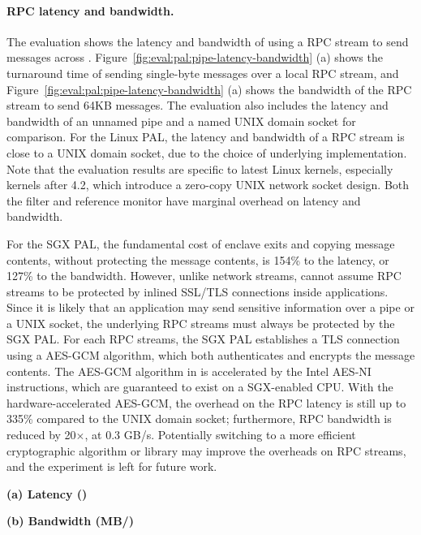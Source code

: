 \paragraph{RPC latency and bandwidth.}
The evaluation shows the latency and bandwidth of using a RPC stream to send messages across \picoprocs{}.
Figure~\ref{fig:eval:pal:pipe-latency-bandwidth} (a) shows
the turnaround time of sending single-byte messages over a local RPC stream, and Figure~\ref{fig:eval:pal:pipe-latency-bandwidth} (a) shows the bandwidth of the RPC stream to send
64KB messages.
The evaluation also includes the latency and bandwidth of an unnamed pipe and a named UNIX domain socket
for comparison.
For the Linux PAL, the latency and bandwidth of a RPC stream is
close to a UNIX domain socket, due to the choice of underlying implementation.
Note that the evaluation results are specific to latest Linux kernels, especially kernels after 4.2,
which introduce a zero-copy UNIX network socket design. 
Both the \seccomp{} filter and reference monitor have marginal overhead on latency and bandwidth.


For the SGX PAL,
the fundamental cost of enclave exits and copying message contents,
without protecting the message contents,
is \roughly{}154\% to the latency,
or \roughly{}127\% to the bandwidth.
However, unlike network streams, \graphenesgx{} cannot assume RPC streams to be protected by inlined SSL/TLS connections
inside applications.
Since it is likely that an application may send sensitive information
over a pipe or a UNIX socket,
the underlying RPC streams must always be protected by the SGX PAL.
For each RPC streams, the SGX PAL establishes a TLS connection using a AES-GCM algorithm, which both authenticates and encrypts the message contents.
The AES-GCM algorithm in \graphenesgx{} is accelerated by the Intel AES-NI instructions, which are guaranteed to exist on a SGX-enabled CPU.
With the hardware-accelerated AES-GCM,
the overhead on the RPC latency is still up to \roughly{}335\% compared to the UNIX domain socket;
furthermore, RPC bandwidth
is reduced by \roughly{}20$\times$, at \roughly{}0.3 GB/s.
Potentially switching to a more efficient cryptographic algorithm or library may improve the overheads on RPC streams,
and the experiment is left for future work.



\begin{figure*}[t!]
\centering
\footnotesize
{}
\parbox{0.30\textwidth}{\quad}
\parbox{0.34\textwidth}{\centering\bf (a) Latency ({\usec})}
\parbox{0.34\textwidth}{\centering\bf (b) Bandwidth (MB/\asec{})}
\caption{(a) Latency of sending a short message over RPC (lower is better), and (b) bandwidth of sending large data (higher is better).
The comparison is between (1)  and  over a pipe or an AF\_UNIX socket on Linux; (2)  and  on the Linux PAL, with and without a \seccomp{} filter ({\bf +SC}) and reference monitor ({\bf +RM}); (3) the same \hostapis{} on the SGX PAL, with and without data protection ({\bf +CHK}).}
\label{fig:eval:pal:pipe-latency-bandwidth}
\end{figure*}


